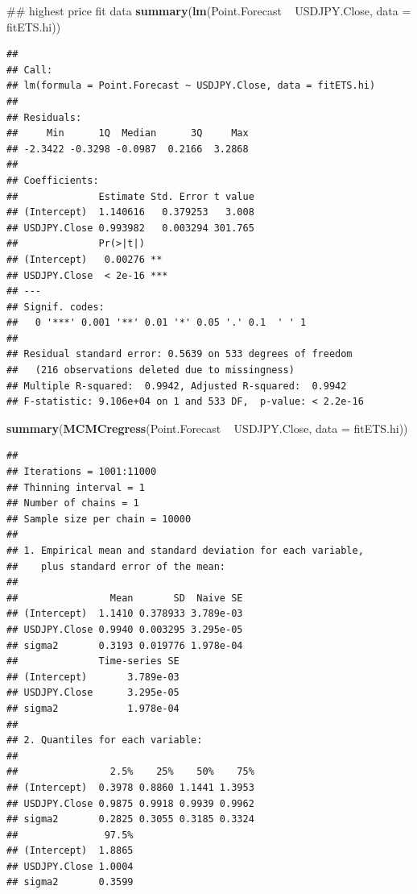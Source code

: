 \documentclass[]{tufte-book}
\newenvironment{Shaded}{}{}
\newcommand{\KeywordTok}[1]{\textcolor[rgb]{0.00,0.44,0.13}{\textbf{#1}}}
\newcommand{\DataTypeTok}[1]{\textcolor[rgb]{0.56,0.13,0.00}{#1}}
\newcommand{\StringTok}[1]{\textcolor[rgb]{0.25,0.44,0.63}{#1}}
\newcommand{\OperatorTok}[1]{\textcolor[rgb]{0.40,0.40,0.40}{#1}}
\newcommand{\NormalTok}[1]{#1}
\begin{document}
\begin{Shaded}
\begin{Highlighting}[]
\NormalTok{## highest price fit data}
\KeywordTok{summary}\NormalTok{(}\KeywordTok{lm}\NormalTok{(Point.Forecast }\OperatorTok{~}\StringTok{ }\NormalTok{USDJPY.Close, }\DataTypeTok{data =}\NormalTok{ fitETS.hi))}
\end{Highlighting}
\end{Shaded}

\begin{verbatim}
## 
## Call:
## lm(formula = Point.Forecast ~ USDJPY.Close, data = fitETS.hi)
## 
## Residuals:
##     Min      1Q  Median      3Q     Max 
## -2.3422 -0.3298 -0.0987  0.2166  3.2868 
## 
## Coefficients:
##              Estimate Std. Error t value
## (Intercept)  1.140616   0.379253   3.008
## USDJPY.Close 0.993982   0.003294 301.765
##              Pr(>|t|)    
## (Intercept)   0.00276 ** 
## USDJPY.Close  < 2e-16 ***
## ---
## Signif. codes:  
##   0 '***' 0.001 '**' 0.01 '*' 0.05 '.' 0.1  ' ' 1
## 
## Residual standard error: 0.5639 on 533 degrees of freedom
##   (216 observations deleted due to missingness)
## Multiple R-squared:  0.9942, Adjusted R-squared:  0.9942 
## F-statistic: 9.106e+04 on 1 and 533 DF,  p-value: < 2.2e-16
\end{verbatim}

\begin{Shaded}
\begin{Highlighting}[]
\KeywordTok{summary}\NormalTok{(}\KeywordTok{MCMCregress}\NormalTok{(Point.Forecast }\OperatorTok{~}\StringTok{ }\NormalTok{USDJPY.Close, }
    \DataTypeTok{data =}\NormalTok{ fitETS.hi))}
\end{Highlighting}
\end{Shaded}

\begin{verbatim}
## 
## Iterations = 1001:11000
## Thinning interval = 1 
## Number of chains = 1 
## Sample size per chain = 10000 
## 
## 1. Empirical mean and standard deviation for each variable,
##    plus standard error of the mean:
## 
##                Mean       SD  Naive SE
## (Intercept)  1.1410 0.378933 3.789e-03
## USDJPY.Close 0.9940 0.003295 3.295e-05
## sigma2       0.3193 0.019776 1.978e-04
##              Time-series SE
## (Intercept)       3.789e-03
## USDJPY.Close      3.295e-05
## sigma2            1.978e-04
## 
## 2. Quantiles for each variable:
## 
##                2.5%    25%    50%    75%
## (Intercept)  0.3978 0.8860 1.1441 1.3953
## USDJPY.Close 0.9875 0.9918 0.9939 0.9962
## sigma2       0.2825 0.3055 0.3185 0.3324
##               97.5%
## (Intercept)  1.8865
## USDJPY.Close 1.0004
## sigma2       0.3599
\end{verbatim}
\end{document}
